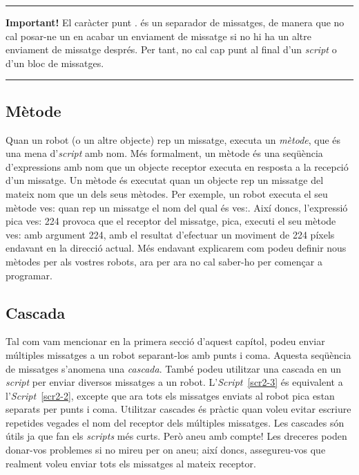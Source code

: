 \noindent
\rule{\textwidth}{2pt}
\noindent
\textbf{Important!} El caràcter punt $.$ és un separador de missatges, de manera que no cal posar-ne un en acabar un enviament de missatge si no hi ha un altre enviament de missatge després. Per tant, no cal cap punt al final d'un \emph{script} o d'un bloc de missatges.\\
\noindent
\rule{\textwidth}{2pt}
 
\subsection{Mètode}
Quan un robot (o un altre objecte) rep un missatge, executa un \emph{mètode}, que és una mena d'\emph{script} amb nom. Més formalment, un mètode és una seqüència d'expressions amb nom que un objecte receptor executa en resposta a la recepció d'un missatge. Un mètode és executat quan un objecte rep un missatge del mateix nom que un dels seus mètodes. Per exemple, un robot executa el seu mètode \textsf{ves:} quan rep un missatge el nom del qual és \textsf{ves:}. Així doncs, l'expressió \textsf{pica ves: 224} provoca que el receptor del missatge, \textsf{pica}, executi el seu mètode \textsf{ves:} amb argument \textsf{224}, amb el resultat d'efectuar un moviment de 224 píxels endavant en la direcció actual. Més endavant explicarem com podeu definir nous mètodes per als vostres robots, ara per ara no cal saber-ho per començar a programar.

\subsection{Cascada}
Tal com vam mencionar en la primera secció d'aquest capítol, podeu enviar múltiples missatges a un robot separant-los amb punts i coma. Aquesta seqüència de missatges s'anomena una \emph{cascada}. També podeu utilitzar una cascada en un \emph{script} per enviar diversos missatges a un robot. L'\emph{Script}~\ref{scr2-3} és equivalent a l'\emph{Script}~\ref{scr2-2}, excepte que ara tots els missatges enviats al robot \textsf{pica} estan separats per punts i coma. Utilitzar cascades és pràctic quan voleu evitar escriure repetides vegades el nom del receptor dels múltiples missatges. Les cascades són útils ja que fan els \emph{scripts} més curts. Però aneu amb compte! Les dreceres poden donar-vos problemes si no mireu per on aneu; així doncs, assegureu-vos que realment voleu enviar tots els missatges al mateix receptor.

